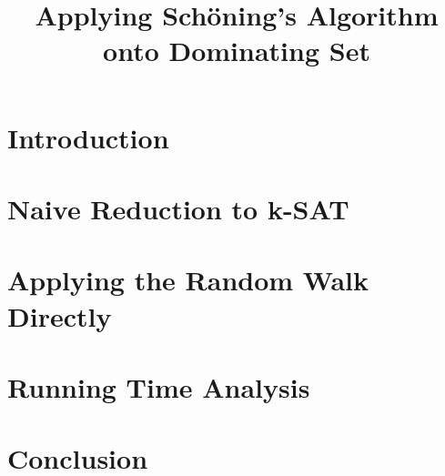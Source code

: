 \documentclass{article}
\title{Applying Sch\"{o}ning's Algorithm onto Dominating Set}
\author{}
\date{}
\begin{document}
\maketitle

\section{Introduction}

\section{Naive Reduction to k-SAT}

\section{Applying the Random Walk Directly}

\section{Running Time Analysis}

\section{Conclusion}
\end{document}
